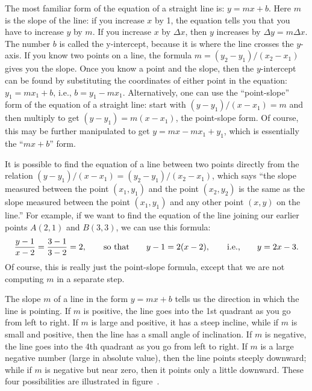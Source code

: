 The most familiar form of the equation of a straight line is:
$y=mx+b$.  Here $m$ is the slope of the line: if you increase $x$ by
1, the equation tells you that you have to increase $y$ by $m$.  If
you increase $x$ by $\Delta x$, then $y$ increases by $\Delta
y=m\Delta x$.  The number $b$ is called the {\dfont y-intercept}, because
it is where the line crosses the $y$-axis.  If you know two points on
a line, the formula $m=(y_2-y_1)/ (x_2-x_1)$ gives you the slope.
Once you know a point and the slope, then the $y$-intercept can be
found by substituting the coordinates of either point in the equation:
$y_1=mx_1+b$, i.e., $b=y_1-mx_1$.  Alternatively, one can use the
``point-slope'' form of the equation of a straight line: start with
$(y-y_1)/(x-x_1)=m$ and then multiply to get $(y-y_1)=m(x-x_1)$, the
point-slope form. Of course, this may be further manipulated to get
$y=mx-mx_1+y_1$, which is essentially the ``$mx+b$'' form.

It is possible to find the equation of a line between two points directly
from the relation $(y-y_1)/(x-x_1)=(y_2-y_1)/(x_2-x_1)$, which says ``the
slope measured between the point $(x_1,y_1)$ and the point $(x_2,y_2)$ is
the same as the slope measured between the point $(x_1,y_1)$ and any other
point $(x,y)$ on the line.''  For example, if we want to find the equation
of the line joining our earlier points $A(2,1)$ and $B(3,3)$, we can use
this formula:
$$
{y-1\over x-2}={3-1\over 3-2}=2,\qquad\hbox{so~that}\qquad
y-1=2(x-2),\qquad\hbox{i.e.,}\qquad y=2x-3.
$$
Of course, this is really just the point-slope formula, except that we
are not computing $m$ in a separate step.

The slope $m$ of a line in the form $y=mx+b$ tells us the
direction in which the line is pointing.  If $m$ is positive, the line goes
into the 1st quadrant as you go from left to right.   If $m$ is large and
positive, it has a steep incline, while if $m$ is small and positive, 
then the line has a small angle of inclination.  If $m$ is negative, the
line goes into the 4th quadrant as you go from left to right.  If $m$ is
a large negative number (large in absolute value), then the line points
steeply downward; while if $m$ is negative but near zero, then it points
only a little downward.  These four possibilities are illustrated in 
figure~.

